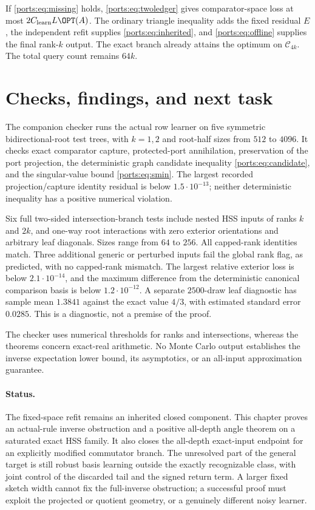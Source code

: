 \documentclass[11pt,oneside,openany,a4paper]{book}
\numberwithin{equation}{chapter}
\theoremstyle{definition}
\theoremstyle{remark}
\begin{document}
If \eqref{ports:eq:missing} holds, \eqref{ports:eq:twoledger} gives comparator-space loss at most $2C_{\rm learn}L\OPT(A)$. The ordinary triangle inequality adds the fixed residual $E$, the independent refit supplies \eqref{ports:eq:inherited}, and \eqref{ports:eq:offline} supplies the final rank-$k$ output. The exact branch already attains the optimum on $\mathcal C_{4k}$. The total query count remains $64k$.

\section{Checks, findings, and next task}
The companion checker runs the actual row learner on five symmetric bidirectional-root test trees, with $k=1,2$ and root-half sizes from $512$ to $4096$. It checks exact comparator capture, protected-port annihilation, preservation of the port projection, the deterministic graph candidate inequality \eqref{ports:eq:candidate}, and the singular-value bound \eqref{ports:eq:smin}. The largest recorded projection/capture identity residual is below $1.5\cdot10^{-13}$; neither deterministic inequality has a positive numerical violation.

Six full two-sided intersection-branch tests include nested HSS inputs of ranks $k$ and $2k$, and one-way root interactions with zero exterior orientations and arbitrary leaf diagonals. Sizes range from $64$ to $256$. All capped-rank identities match. Three additional generic or perturbed inputs fail the global rank flag, as predicted, with no capped-rank mismatch. The largest relative exterior loss is below $2.1\cdot10^{-14}$, and the maximum difference from the deterministic canonical comparison basis is below $1.2\cdot10^{-12}$. A separate $2500$-draw leaf diagnostic has sample mean $1.3841$ against the exact value $4/3$, with estimated standard error $0.0285$. This is a diagnostic, not a premise of the proof.

The checker uses numerical thresholds for ranks and intersections, whereas the theorems concern exact-real arithmetic. No Monte Carlo output establishes the inverse expectation lower bound, its asymptotics, or an all-input approximation guarantee. 

\paragraph{Status.}
The fixed-space refit remains an inherited closed component. This chapter proves an actual-rule inverse obstruction and a positive all-depth angle theorem on a saturated exact HSS family. It also closes the all-depth exact-input endpoint for an explicitly modified commutator branch. The unresolved part of the general target is still robust basis learning outside the exactly recognizable class, with joint control of the discarded tail and the signed return term. A larger fixed sketch width cannot fix the full-inverse obstruction; a successful proof must exploit the projected or quotient geometry, or a genuinely different noisy learner.
\end{document}
